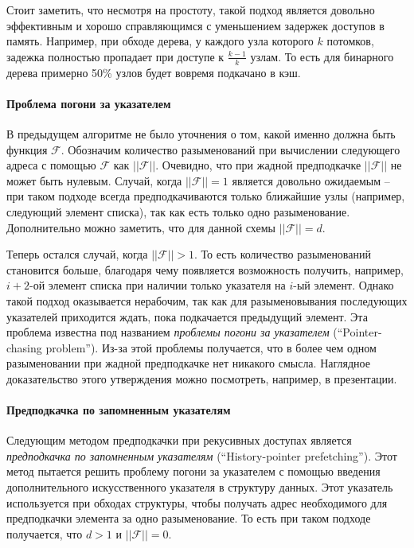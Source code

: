 \documentclass[12pt,a4paper]{article}
\begin{document}
Стоит заметить, что несмотря на простоту, такой подход является довольно эффективным и хорошо справляющимся с уменьшением задержек доступов в память. Например, при обходе дерева, у каждого узла которого $k$ потомков, задежка полностью пропадает при доступе к $\frac{k-1}{k}$ узлам. То есть для бинарного дерева примерно 50\% узлов будет вовремя подкачано в кэш.

\paragraph{Проблема погони за указателем}

В предыдущем алгоритме не было уточнения о том, какой именно должна быть функция $\mathcal{F}$. Обозначим количество разыменований при вычислении следующего адреса с помощью $\mathcal{F}$ как $||\mathcal{F}||$. Очевидно, что при жадной предподкачке $||\mathcal{F}||$ не может быть нулевым. Случай, когда $||\mathcal{F}|| = 1$ является довольно ожидаемым -- при таком подходе всегда предподкачиваются только ближайшие узлы (например, следующий элемент списка), так как есть только одно разыменование. Дополнительно можно заметить, что для данной схемы $||\mathcal{F}|| = d$.

Теперь остался случай, когда $||\mathcal{F}|| > 1$. То есть количество разыменований становится больше, благодаря чему появляется возможность получить, например, $i+2$-ой элемент списка при наличии только указателя на $i$-ый элемент. Однако такой подход оказывается нерабочим, так как для разыменовывания последующих указателей приходится ждать, пока подкачается предыдущий элемент. Эта проблема известна под названием \emph{проблемы погони за указателем} (``Pointer-chasing problem''). Из-за этой проблемы получается, что в более чем одном разыменовании при жадной предподкачке нет никакого смысла. Наглядное доказательство этого утверждения можно посмотреть, например, в презентации\cite{MowryChasing}.

\paragraph{Предподкачка по запомненным указателям}

Следующим методом предподкачки при рекусивных доступах является \emph{предподкачка по запомненным указателям} (``History-pointer prefetching''). Этот метод пытается решить проблему погони за указателем с помощью введения дополнительного искусственного указателя в структуру данных. Этот указатель используется при обходах структуры, чтобы получать адрес необходимого для предподкачки элемента за одно разыменование. То есть при таком подходе получается, что $d > 1$ и $||\mathcal{F}|| = 0$.
\end{document}
